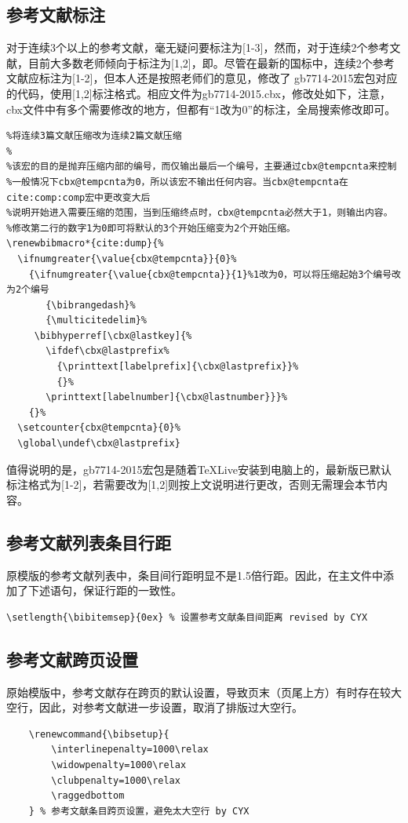 \subsection{参考文献标注}
对于连续3个以上的参考文献，毫无疑问要标注为[1-3]，然而，对于连续2个参考文献，目前大多数老师倾向于标注为[1,2]，即\cite{_,_a}。尽管在最新的国标中，连续2个参考文献应标注为[1-2]，但本人还是按照老师们的意见，修改了
gb7714-2015宏包对应的代码，使用[1,2]标注格式。相应文件为gb7714-2015.cbx，修改处如下，注意，cbx文件中有多个需要修改的地方，但都有“1改为0”的标注，全局搜索修改即可。
\begin{lstlisting}
%将连续3篇文献压缩改为连续2篇文献压缩
%
%该宏的目的是抛弃压缩内部的编号，而仅输出最后一个编号，主要通过cbx@tempcnta来控制
%一般情况下cbx@tempcnta为0，所以该宏不输出任何内容。当cbx@tempcnta在cite:comp:comp宏中更改变大后
%说明开始进入需要压缩的范围，当到压缩终点时，cbx@tempcnta必然大于1，则输出内容。
%修改第二行的数字1为0即可将默认的3个开始压缩变为2个开始压缩。
\renewbibmacro*{cite:dump}{%
  \ifnumgreater{\value{cbx@tempcnta}}{0}%
    {\ifnumgreater{\value{cbx@tempcnta}}{1}%1改为0，可以将压缩起始3个编号改为2个编号
       {\bibrangedash}%
       {\multicitedelim}%
     \bibhyperref[\cbx@lastkey]{%
       \ifdef\cbx@lastprefix%
         {\printtext[labelprefix]{\cbx@lastprefix}}%
         {}%
       \printtext[labelnumber]{\cbx@lastnumber}}}%
    {}%
  \setcounter{cbx@tempcnta}{0}%
  \global\undef\cbx@lastprefix}
\end{lstlisting}

值得说明的是，gb7714-2015宏包是随着TeXLive安装到电脑上的，最新版已默认标注格式为[1-2]，若需要改为[1,2]则按上文说明进行更改，否则无需理会本节内容。
\subsection{参考文献列表条目行距}
原模版的参考文献列表中，条目间行距明显不是1.5倍行距。因此，在主文件中添加了下述语句，保证行距的一致性。
\begin{lstlisting}
\setlength{\bibitemsep}{0ex} % 设置参考文献条目间距离 revised by CYX
\end{lstlisting}
\subsection{参考文献跨页设置}
原始模版中，参考文献存在跨页的默认设置，导致页末（页尾上方）有时存在较大空行，因此，对参考文献进一步设置，取消了排版过大空行。
\begin{lstlisting}
    \renewcommand{\bibsetup}{
        \interlinepenalty=1000\relax
        \widowpenalty=1000\relax
        \clubpenalty=1000\relax
        \raggedbottom
    } % 参考文献条目跨页设置，避免太大空行 by CYX
\end{lstlisting}

